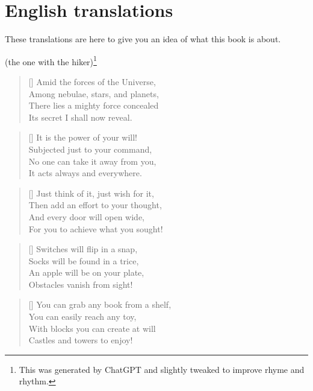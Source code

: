 \section*{English translations}
These translations are here to give you an idea of what this book is about.


\PlainPoemTitle
{}
\vspace{-5mm}
\begin{center}
	(the one with the hiker)\footnote{This was generated by ChatGPT and slightly tweaked to improve rhyme and rhythm.}
\end{center}

\begin{multicols}{2}
	
	
	\begin{verse}[\versewidth]
		Amid the forces of the Universe,\\
		Among nebulae, stars, and planets,\\
		There lies a mighty force concealed\\
		Its secret I shall now reveal.
	\end{verse}
	
	\begin{verse}[\versewidth]
		It is the power of your will!\\
		Subjected just to your command,\\
		No one can take it away from you,\\
		It acts always and everywhere.
	\end{verse}
	
	\begin{verse}[\versewidth]
		Just think of it, just wish for it,\\
		Then add an effort to your thought,\\
		And every door will open wide,\\
		For you to achieve what you sought!
	\end{verse}
	
	
	\begin{verse}[\versewidth]
		Switches will flip in a snap,\\
		Socks will be found in a trice,\\
		An apple will be on your plate,\\
		Obstacles vanish from sight!
	\end{verse}
	
	\begin{verse}[\versewidth]
		You can grab any book from a shelf,\\
		You can easily reach any toy,\\
		With blocks you can create at will\\
		Castles and towers to enjoy!
	\end{verse}
	

\end{multicols}
